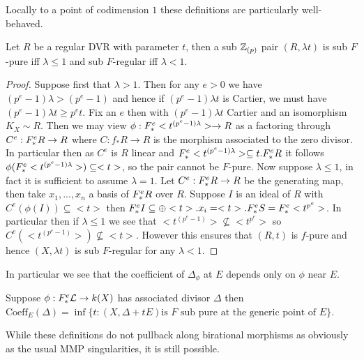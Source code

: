Locally to a point of codimension $1$ these definitions are particularly well-behaved.
\begin{lemma}
	Let $R$ be a regular DVR with parameter $t$, then a sub $\mathbb{Z}_{(p)}$ pair $(R,\lambda t)$ is sub $F$-pure iff $\lambda \leq 1$ and sub $F$-regular iff $\lambda < 1$.
\end{lemma}
\begin{proof}
	Suppose first that $\lambda > 1$. Then for any $e >0$ we have $(p^{e}-1)\lambda >(p^{e}-1)$ and hence if $(p^{e}-1)\lambda t$ is Cartier, we must have $(p^{e}-1)\lambda t \geq p^{e} t$. Fix an $e$ then with $(p^{e}-1)\lambda t$ Cartier and an isomorphism $K_{X}\sim R$. Then we may view $\phi: F^{e}_{*} <t^{(p^{e}-1)\lambda}> \to R$ as a factoring through $C^{e}: F^{e}_{*} R \to R$ where $C:f_{*}R \to R$ is the morphism associated to the zero divisor. In particular then as $C^{e}$ is $R$ linear and $F^{e}_{*} <t^{(p^{e}-1)\lambda}> \subseteq t.F^{e}_{*} R$ it follows $\phi(F^{e}_{*} <t^{(p^{e}-1)\lambda}> ) \subseteq <t>$, so the pair cannot be $F$-pure.
	Now suppose $\lambda \leq 1$, in fact it is sufficient to assume $\lambda =1$.
	Let $C^{e}:F^{e}_{*} R \to R$ be the generating map, then take $x_{1},...,x_{n}$ a basis of $F^{e}_{*} R$ over $R$. Suppose $I$ is an ideal of $R$ with $C^{e}(\phi(I)) \subseteq <t>$ then $F^{e}_{*} I \subseteq \oplus <t>.x_{i} =<t>.F^{e}_{*} S= F^{e}_{*} <t^{p^{e}}>$. In particular then if $\lambda \leq 1$ we see that  $<t^{(p^{e}-1)}>\not\subseteq <t^{p^{e}}>$ so $C^{e}(<t^{(p^{e}-1)}>) \not\subseteq <t>$. However this ensures that $(R,t)$ is $f$-pure and hence $(X,\lambda t)$ is sub $F$-regular for any $\lambda <1$.   
	\end{proof}
In particular we see that the coefficient of $\Delta_{\phi}$ at $E$ depends only on $\phi$ near $E$.

\begin{corollary}\label{local}
	Suppose $\phi:F^{e}_{*}\mathcal{L} \to k(X)$ has associated divisor $\Delta$ then $\text{Coeff}_{E}(\Delta)=\inf\{t: (X,\Delta+tE) \text{is } F \text{ sub pure at the generic point of } E\}$. 
\end{corollary}

While these definitions do not pullback along birational morphisms as obviously as the usual MMP singularities, it is still possible.

